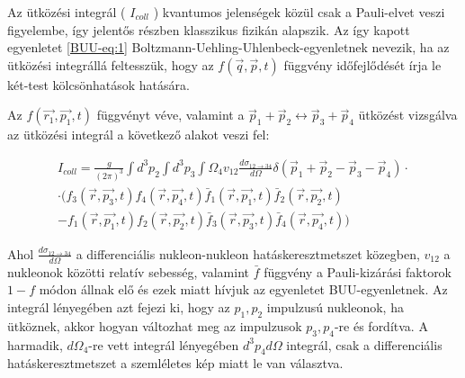 \documentclass[a4paper,12pt]{article}
\begin{document}
\vspace{5mm}

\par Az ütközési integrál ( $I_{coll}$ ) kvantumos jelenségek közül csak a Pauli-elvet veszi figyelembe, így jelentős részben klasszikus fizikán alapszik. Az így kapott egyenletet \eqref{BUU-eq:1} Boltzmann-Uehling-Uhlenbeck-egyenletnek nevezik, ha az ütközési integrállá feltesszük, hogy az $f(\vec{q}, \vec{p}, t)$ függvény időfejlődését írja le két-test kölcsönhatások hatására. 

\vspace{5mm}

\par Az $f(\vec{r_{1}}, \vec{p_{1}}, t)$ függvényt véve, valamint a $\vec{p}_{1} + \vec{p}_{2} \longleftrightarrow \vec{p}_{3} + \vec{p}_{4}$ ütközést vizsgálva az ütközési integrál a következő alakot veszi fel:

\vspace{5mm}

\begin{equation}
\begin{split}
I_{coll} = \frac{g}{(2\pi)^{3}}\int d^{3}p_{2}\int d^{3}p_{3}\int \Omega_{4}v_{12}\frac{d\sigma_{12 \rightarrow 34}}{d\Omega}\delta(\vec{p}_{1} + \vec{p}_{2} - \vec{p}_{3} - \vec{p}_{4})\cdot\\
\cdot(f_{3}(\vec{r}, \vec{p_{3}}, t)f_{4}(\vec{r}, \vec{p_{4}}, t)\bar{f}_{1}(\vec{r}, \vec{p_{1}}, t)\bar{f}_{2}(\vec{r}, \vec{p_{2}}, t) \\
- f_{1}(\vec{r}, \vec{p_{1}}, t)f_{2}(\vec{r}, \vec{p_{2}}, t)\bar{f}_{3}(\vec{r}, \vec{p_{3}}, t)\bar{f}_{4}(\vec{r}, \vec{p_{4}}, t))
\end{split}
\end{equation}

\vspace{5mm}

\par Ahol $\frac{d\sigma_{12 \rightarrow 34}}{d\Omega}$ a differenciális nukleon-nukleon hatáskeresztmetszet közegben, $v_{12}$ a nukleonok közötti relatív sebesség, valamint $\bar{f}$ függvény a Pauli-kizárási faktorok $1 - f$ módon állnak elő és ezek miatt hívjuk az egyenletet BUU-egyenletnek. Az integrál lényegében azt fejezi ki, hogy az $p_{1},p_{2}$ impulzusú nukleonok, ha ütköznek, akkor hogyan változhat meg az impulzusok $p_{3}, p_{4}$-re és fordítva. A harmadik, $d\Omega_{4}$-re vett integrál lényegében $d^{3}p_{4}d\Omega$ integrál, csak a differenciális hatáskeresztmetszet a szemléletes kép miatt le van választva.
\end{document}
